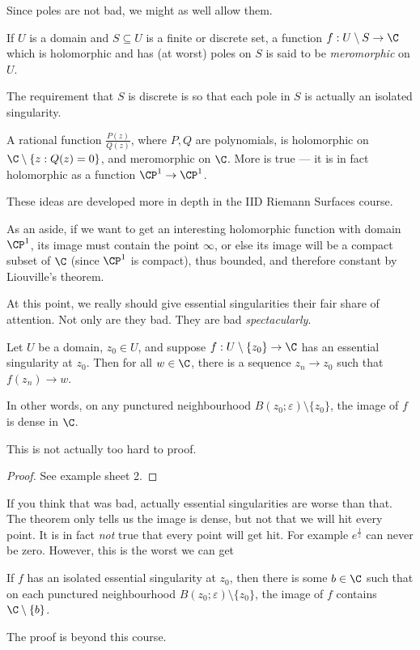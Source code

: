\documentclass[a4paper]{article}
\begin{document}
Since poles are not bad, we might as well allow them.
\begin{defi}
  If $U$ is a domain and $S \subseteq U$ is a finite or discrete set, a function $f: U \setminus S \to \C$ which is holomorphic and has (at worst) poles on $S$ is said to be \emph{meromorphic} on $U$.
\end{defi}
The requirement that $S$ is discrete is so that each pole in $S$ is actually an isolated singularity.

\begin{eg}
  A rational function $\frac{P(z)}{Q(z)}$, where $P, Q$ are polynomials, is holomorphic on $\C \setminus \{z: Q(z) = 0\}$, and meromorphic on $\C$. More is true --- it is in fact holomorphic as a function $\CP^1 \to \CP^1$.
\end{eg}
These ideas are developed more in depth in the IID Riemann Surfaces course.

As an aside, if we want to get an interesting holomorphic function with domain $\CP^1$, its image must contain the point $\infty$, or else its image will be a compact subset of $\C$ (since $\CP^1$ is compact), thus bounded, and therefore constant by Liouville's theorem.

At this point, we really should give essential singularities their fair share of attention. Not only are they bad. They are bad \emph{spectacularly}.

\begin{thm}
  Let $U$ be a domain, $z_0 \in U$, and suppose $f: U \setminus \{z_0\} \to \C$ has an essential singularity at $z_0$. Then for all $w \in \C$, there is a sequence $z_n \to z_0$ such that $f(z_n) \to w$.

  In other words, on any punctured neighbourhood $B(z_0; \varepsilon) \setminus \{z_0\}$, the image of $f$ is dense in $\C$.
\end{thm}
This is not actually too hard to proof.

\begin{proof}
  See example sheet 2.
\end{proof}

If you think that was bad, actually essential singularities are worse than that. The theorem only tells us the image is dense, but not that we will hit every point. It is in fact \emph{not} true that every point will get hit. For example $e^{\frac{1}{z}}$ can never be zero. However, this is the worst we can get

\begin{thm}
  If $f$ has an isolated essential singularity at $z_0$, then there is some $b \in \C$ such that on each punctured neighbourhood $B(z_0; \varepsilon)\setminus \{z_0\}$, the image of $f$ contains $\C\setminus \{b\}$.
\end{thm}
The proof is beyond this course.
\end{document}

